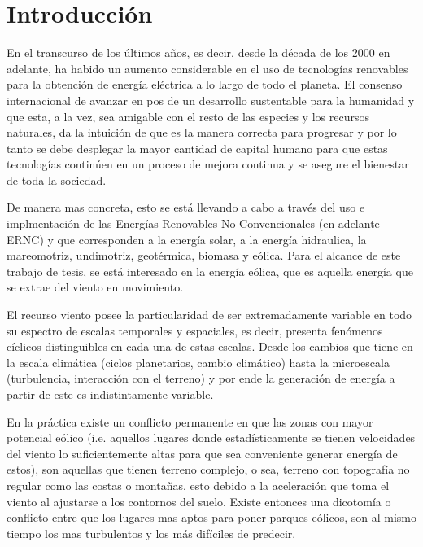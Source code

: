 \chapter{Introducción}
En el transcurso de los últimos años, es decir, desde la década de los 2000 en adelante, ha habido un aumento considerable en el uso de tecnologías renovables para la obtención de energía eléctrica a lo largo de todo el planeta. El consenso internacional de avanzar en pos de un desarrollo sustentable para la humanidad y que esta, a la vez, sea amigable con el resto de las especies y los recursos naturales, da la intuición de que es la manera correcta para progresar y por lo tanto se debe desplegar la mayor cantidad de capital humano para que estas tecnologías continúen en un proceso de mejora continua y se asegure el bienestar de toda la sociedad.

De manera mas concreta, esto se está llevando a cabo a través del uso e implmentación de las Energías Renovables No Convencionales (en adelante ERNC) y que corresponden a la energía solar, a la energía hidraulica, la mareomotriz, undimotriz, geotérmica, biomasa y eólica. Para el alcance de este trabajo de tesis, se está interesado en la energía eólica, que es aquella energía que se extrae del viento en movimiento.

El recurso viento posee la particularidad de ser extremadamente variable en todo su espectro de escalas temporales y espaciales, es decir, presenta fenómenos cíclicos distinguibles en cada una de estas escalas. Desde los cambios que tiene en la escala climática (ciclos planetarios, cambio climático) hasta la microescala (turbulencia, interacción con el terreno) y por ende la generación de energía a partir de este es indistintamente variable. 
 


En la práctica existe un conflicto permanente en que las zonas con mayor potencial eólico (i.e. aquellos lugares donde estadísticamente se tienen velocidades del viento lo suficientemente altas para que sea conveniente generar energía de estos), son aquellas que tienen terreno complejo, o sea, terreno con topografía no regular como las costas o montañas, esto debido a la aceleración que toma el viento al ajustarse a los contornos del suelo. Existe entonces una dicotomía o conflicto entre que los lugares mas aptos para poner parques eólicos, son al mismo tiempo los mas turbulentos y los más difíciles de predecir.

